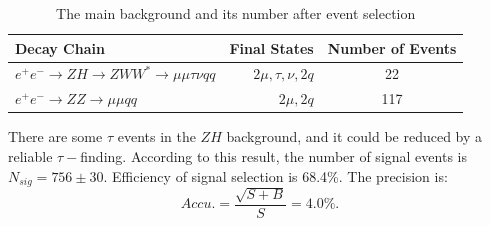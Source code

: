 \documentclass[11pt,a4paper]{cepcnote}
\begin{document}
\begin{table}[H]
	\begin{center}
		\begin{tabular}{lrc}
			\hline\hline
			Decay Chain	& Final States 	&	Number of Events	\\
			\hline
			$e^+e^-\to ZH \to ZWW^* \to \mu\mu\tau\nu qq $ 	& $2\mu, \tau, \nu, 2q$	&	22\\
			$e^+e^-\to ZZ \to \mu\mu qq $ 					& $2\mu, 2q$		&	117\\
			\hline\hline
		\end{tabular}
		\caption[]{The main background and its number after event selection}
		\label{tab:bkginuuuvqq}
	\end{center}
\end{table}
There are some $\tau$ events in the $ZH$ background, and it could be reduced by a reliable $\tau-$finding. 
According to this result, the number of signal events is $N_{sig} = 756\pm 30$. Efficiency of signal selection is 68.4\%. 
The precision is:
\begin{equation*}
	Accu. = \frac{\sqrt{S+B}}{S} = 4.0\%.
\end{equation*}
\end{document}
